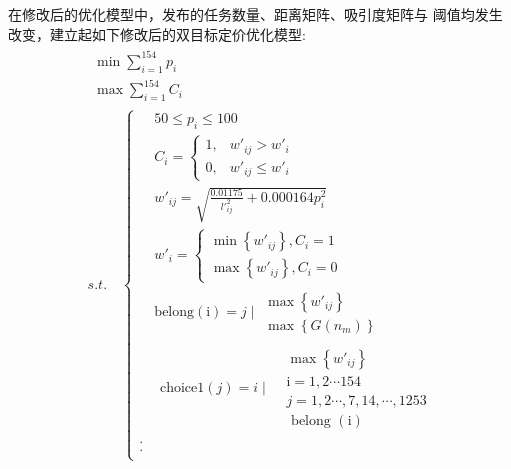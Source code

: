 在修改后的优化模型中，发布的任务数量、距离矩阵、吸引度矩阵与
阈值均发生改变，建立起如下修改后的双目标定价优化模型:
$$\begin{aligned}
    & \begin{array}{l}
       \min \sum_{i=1}^{154} p_{i} \\
       \max \sum_{i=1}^{154} C_{i}
   \end{array} \\
    & s.t.\quad
   \begin{cases}
        & 50 \leq p_{i} \leq 100                                        \\
        & C_{i}=\left\{\begin{array}{ll}
           1, & w'_{i j}>w'_{i}      \\
           0, & w'_{i j} \leq w'_{i}
       \end{array}\right.                \\
        & {w'}_{i j}=\sqrt{\frac{0.01175}{{l'}_{i j}^{2}}+0.000164 p_{i}^{2}} \\
        & {w'}_{i}=\left\{\begin{array}{l}
           \min \left\{w'_{i j}\right\}, C_{i}=1 \\
           \max \left\{w'_{i j}\right\}, C_{i}=0
       \end{array}\right.                \\
        & \text {belong}(\mathrm{i})=j \mid \begin{array}{l}
           \max \left\{{w'}_{i j}\right\} \\
           \max \left\{G\left(n_{m}\right)\right\}
       \end{array}  \\
        & \begin{array}{ll}
           \text {choice1}(j)=i \mid & \begin{array}{l}
               \max \left\{{w'}_{i j}\right\}      \\
               \mathrm{i}=1,2 \cdots 154        \\
               j=1,2 \cdots, 7,14, \cdots, 1253 \\
               \text { belong }(\mathrm{i})
           \end{array}
       \end{array}                                    \\
       .                                                                \\
       .                                                                \\

\end{cases}
\end{aligned}$$
